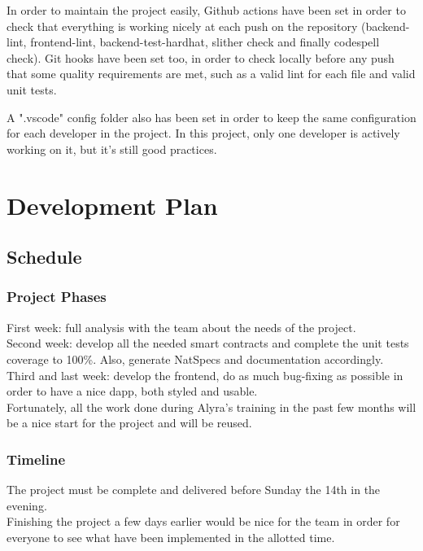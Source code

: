 \documentclass[a4paper, 12pt]{article}
\begin{document}
In order to maintain the project easily, Github actions have been set in order to check that everything is working nicely at each push on the repository (backend-lint, frontend-lint, backend-test-hardhat, slither check and finally codespell check). Git hooks have been set too, in order to check locally before any push that some quality requirements are met, such as a valid lint for each file and valid unit tests.

A ".vscode" config folder also has been set in order to keep the same configuration for each developer in the project. In this project, only one developer is actively working on it, but it's still good practices.

\section{Development Plan}

\subsection{Schedule}
\subsubsection{Project Phases}

First week: full analysis with the team about the needs of the project.\\

Second week: develop all the needed smart contracts and complete the unit tests coverage to 100\%. Also, generate NatSpecs and documentation accordingly.\\

Third and last week: develop the frontend, do as much bug-fixing as possible in order to have a nice dapp, both styled and usable.\\

Fortunately, all the work done during Alyra's training in the past few months will be a nice start for the project and will be reused.

\subsubsection{Timeline}

The project must be complete and delivered before Sunday the 14th in the evening.\\

Finishing the project a few days earlier would be nice for the team in order for everyone to see what have been implemented in the allotted time.
\end{document}
